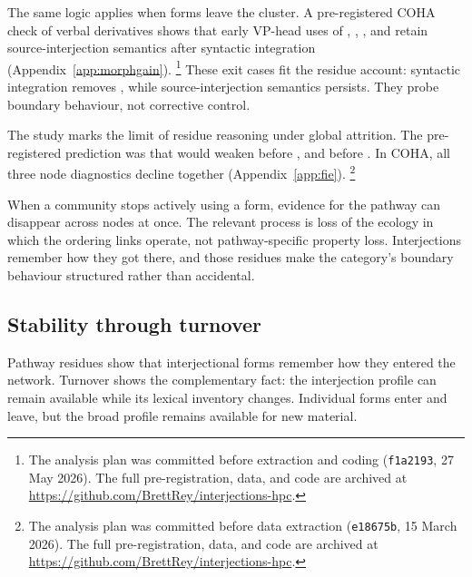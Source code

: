 \documentclass[12pt]{article}
\newif\ifblind
\begin{document}
The same logic applies when forms leave the cluster. A pre-registered
COHA check of verbal derivatives shows that early VP-head uses of
, , , and
 retain source-interjection semantics after syntactic
integration (Appendix~\ref{app:morphgain}).%
\footnote{The analysis plan was committed before extraction and coding
  (\texttt{f1a2193}, 27 May 2026). \ifblind The full pre-registration,
  data, and code are archived at [link removed for blind review].\else
  The full pre-registration, data, and code are archived at
  \url{https://github.com/BrettRey/interjections-hpc}.\fi}
These exit cases fit the residue account: syntactic integration removes
, while source-interjection semantics
persists. They probe boundary behaviour, not corrective control.

The  study marks the limit of residue reasoning under
global attrition. The pre-registered prediction was that
 would weaken before
, and 
before . In COHA, all three node
diagnostics decline together (Appendix~\ref{app:fie}).%
\footnote{The analysis plan was committed before data extraction
  (\texttt{e18675b}, 15 March 2026). \ifblind The full
  pre-registration, data, and code are archived at [link removed for
  blind review].\else The full pre-registration, data, and code are
  archived at \url{https://github.com/BrettRey/interjections-hpc}.\fi}

When a community stops actively using a form, evidence for the pathway
can disappear across nodes at once. The relevant process is loss of the
ecology in which the ordering links operate, not pathway-specific property
loss. Interjections remember how they got there, and those residues make
the category's boundary behaviour structured rather than accidental.

\subsection{Stability through turnover}\label{sec:turnover}

Pathway residues show that interjectional forms remember how they entered
the network. Turnover shows the complementary fact: the interjection
profile can remain available while its lexical inventory changes.
Individual forms enter and leave, but the broad profile remains
available for new material.
\end{document}
